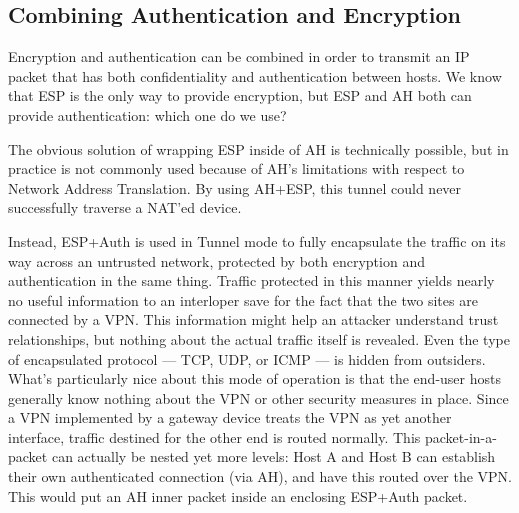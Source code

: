 \documentclass[12pt]{article}
\begin{document}
\subsection{Combining Authentication and Encryption}
Encryption and authentication can be combined in order to transmit an IP packet that has both confidentiality and authentication between hosts. We know that ESP is the only way to provide encryption, but ESP and AH both can provide authentication: which one do we use?
 
The obvious solution of wrapping ESP inside of AH is technically possible, but in practice is not commonly used because of AH's limitations with respect to Network Address Translation. By using AH+ESP, this tunnel could never successfully traverse a NAT'ed device.

Instead, ESP+Auth is used in Tunnel mode to fully encapsulate the traffic on its way across an untrusted network, protected by both encryption and authentication in the same thing.
Traffic protected in this manner yields nearly no useful information to an interloper save for the fact that the two sites are connected by a VPN. This information might help an attacker understand trust relationships, but nothing about the actual traffic itself is revealed. Even the type of encapsulated protocol — TCP, UDP, or ICMP — is hidden from outsiders.
What's particularly nice about this mode of operation is that the end-user hosts generally know nothing about the VPN or other security measures in place. Since a VPN implemented by a gateway device treats the VPN as yet another interface, traffic destined for the other end is routed normally.
This packet-in-a-packet can actually be nested yet more levels: Host A and Host B can establish their own authenticated connection (via AH), and have this routed over the VPN. This would put an AH inner packet inside an enclosing ESP+Auth packet.
\end{document}
